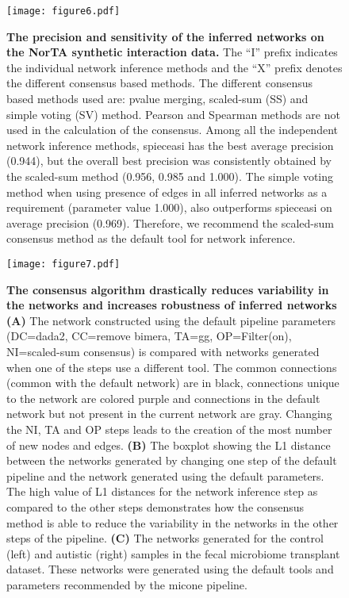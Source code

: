   \begin{figure}[h]
    \centering
    \texttt{[image: figure6.pdf]}
    \caption{
      \textbf{The precision and sensitivity of the inferred networks on the NorTA synthetic interaction data.}
      The ``I'' prefix indicates the individual network inference methods and the ``X'' prefix denotes the different consensus based methods.
      The different consensus based methods used are: pvalue merging, scaled-sum (SS) and simple voting (SV) method.
      Pearson and Spearman methods are not used in the calculation of the consensus.
      Among all the independent network inference methods, \ac{spieceasi} has the best average precision (0.944), but the overall best precision was consistently obtained by the scaled-sum method (0.956, 0.985 and 1.000).
      The simple voting method when using presence of edges in all inferred networks as a requirement (parameter value 1.000), also outperforms \ac{spieceasi} on average precision (0.969).
      Therefore, we recommend the scaled-sum consensus method as the default tool for network inference.
    }
    \label{fig:figure6}
  \end{figure}
  \FloatBarrier
  \newpage

  \begin{figure}[H]
    \centering
    \texttt{[image: figure7.pdf]}
  \end{figure}
  \begin{figure}[H]
    \centering
    \caption{
      \textbf{The consensus algorithm drastically reduces variability in the networks and increases robustness of inferred networks}
      \textbf{(A)} The network constructed using the default pipeline parameters (DC=\ac{dada2}, CC=remove bimera, TA=\ac{gg}, OP=Filter(on), NI=scaled-sum consensus) is compared with networks generated when one of the steps use a different tool.
      The common connections (common with the default network) are in black, connections unique to the network are colored purple and connections in the default network but not present in the current network are gray.
      Changing the NI, TA and OP steps leads to the creation of the most number of new nodes and edges.
      \textbf{(B)} The boxplot showing the L1 distance between the networks generated by changing one step of the default pipeline and the network generated using the default parameters.
      The high value of L1 distances for the network inference step as compared to the other steps demonstrates how the consensus method is able to reduce the variability in the networks in the other steps of the pipeline.
      \textbf{(C)} The networks generated for the control (left) and autistic (right) samples in the fecal microbiome transplant dataset.
      These networks were generated using the default tools and parameters recommended by the \ac{micone} pipeline.
    }
    \label{fig:figure7}
  \end{figure}
